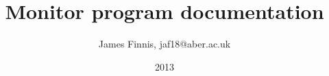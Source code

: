 \documentclass[a4paper]{article}
\title{Monitor program documentation}
\date{2013}
\author{James Finnis, jaf18@aber.ac.uk}
\begin{document}
\maketitle
\newpage
\tableofcontents

\newcommand{\isqc}{$\mathrm{I}^2\mathrm{C}$}

\newcommand{\todo}[1]{
    \begin{center}
    \fbox{\parbox{4in}{\textbf{To Do}\vspace*{1em} \\#1}}
    \end{center}}
    
\renewcommand{\labelitemii}{$\circ$}




\end{document}
